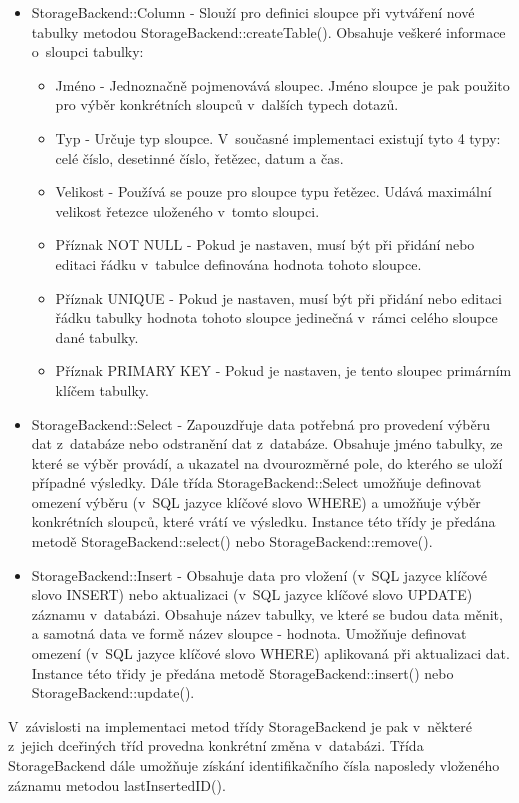 \begin{itemize}
\item StorageBackend::Column - Slouží pro definici sloupce při vytváření nové tabulky metodou StorageBackend::createTable().
Obsahuje veškeré informace o~sloupci tabulky:
\begin{itemize}
\item Jméno - Jednoznačně pojmenovává sloupec. Jméno sloupce je pak použito pro výběr konkrétních sloupců v~dalších typech
dotazů.
\item Typ - Určuje typ sloupce. V~současné implementaci existují tyto 4 typy: celé číslo, desetinné číslo, řetězec, datum a čas.
\item Velikost - Používá se pouze pro sloupce typu řetězec. Udává maximální velikost řetezce uloženého v~tomto sloupci.
\item Příznak NOT NULL - Pokud je nastaven, musí být při přidání nebo editaci řádku v~tabulce definována hodnota tohoto sloupce.
\item Příznak UNIQUE - Pokud je nastaven, musí být při přidání nebo editaci řádku tabulky hodnota tohoto sloupce jedinečná v~rámci
celého sloupce dané tabulky.
\item Příznak PRIMARY KEY - Pokud je nastaven, je tento sloupec primárním klíčem tabulky.
\end{itemize}
\item StorageBackend::Select - Zapouzdřuje data potřebná pro provedení výběru dat z~databáze nebo odstranění dat z~databáze.
Obsahuje jméno tabulky,
ze které se výběr provádí, a ukazatel na dvourozměrné pole, do kterého se uloží případné
výsledky. Dále třída StorageBackend::Select umožňuje
definovat omezení výběru (v~SQL jazyce klíčové slovo WHERE) a umožňuje výběr konkrétních sloupců, které vrátí ve výsledku.
Instance této třídy je předána metodě StorageBackend::select() nebo StorageBackend::remove().
\item StorageBackend::Insert - Obsahuje data pro vložení (v~SQL jazyce klíčové
slovo INSERT) nebo aktualizaci (v~SQL jazyce klíčové slovo UPDATE)
záznamu v~databázi. Obsahuje název tabulky, ve které se budou data měnit, a samotná data ve formě název sloupce - hodnota.
Umožňuje definovat omezení (v~SQL jazyce klíčové slovo WHERE) aplikovaná při aktualizaci dat. Instance této třidy je předána metodě
StorageBackend::insert() nebo StorageBackend::update().
\end{itemize}

V~závislosti na implementaci metod třídy StorageBackend je pak v~některé
z~jejich dceřiných tříd provedna konkrétní změna
v~databázi. Třída StorageBackend dále umožňuje získání identifikačního čísla naposledy vloženého záznamu metodou lastInsertedID().


